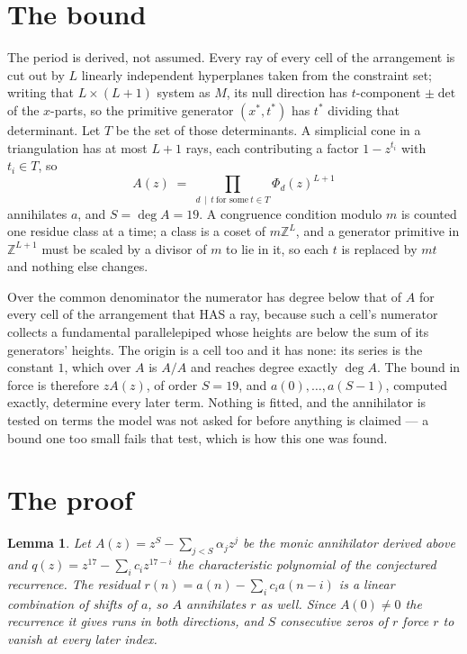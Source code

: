 \documentclass[11pt,a4paper]{article}
\theoremstyle{plain}
\newtheorem{lemma}[theorem]{Lemma}
\theoremstyle{definition}
\begin{document}
\section{The bound}

The period is derived, not assumed. Every ray of every cell of the arrangement is cut out by
$L$ linearly independent hyperplanes taken from the constraint set; writing that $L\times(L+1)$
system as $M$, its null direction has $t$-component $\pm\det$ of the $x$-parts, so the
primitive generator $(x^*,t^*)$ has $t^*$ dividing that determinant. Let $T$ be the set of
those determinants. A simplicial cone in a triangulation has at most $L+1$ rays, each
contributing a factor $1-z^{t_i}$ with $t_i\in T$, so
\[
A(z)\;=\;\prod_{d\,\mid\,t\ \text{for some}\ t\in T}\Phi_d(z)^{L+1}
\]
annihilates $a$, and $S=\deg A=19$. A congruence condition modulo $m$ is counted one residue
class at a time; a class is a coset of $m\mathbb{Z}^L$, and a generator primitive in
$\mathbb{Z}^{L+1}$ must be scaled by a divisor of $m$ to lie in it, so each $t$ is replaced
by $mt$ and nothing else changes.

Over the common denominator the numerator has degree below that of $A$ for every cell of the
arrangement that HAS a ray, because such a cell's numerator collects a fundamental
parallelepiped whose heights are below the sum of its generators' heights. The origin is a cell
too and it has none: its series is the constant $1$, which over $A$ is $A/A$ and reaches degree
exactly $\deg A$. The bound in force is therefore $zA(z)$, of order $S=19$, and
$a(0),\dots,a(S-1)$, computed exactly, determine every later term. Nothing is fitted, and the
annihilator is tested on terms the model was not asked for before anything is claimed --- a
bound one too small fails that test, which is how this one was found.

\section{The proof}

\begin{lemma}\label{lem:crit}
Let $A(z)=z^S-\sum_{j<S}\alpha_jz^{j}$ be the monic annihilator derived above and
$q(z)=z^{17}-\sum_ic_iz^{17-i}$ the characteristic polynomial of the conjectured
recurrence. The residual $r(n)=a(n)-\sum_ic_ia(n-i)$ is a linear combination of shifts of $a$,
so $A$ annihilates $r$ as well. Since $A(0)\ne0$ the recurrence it gives runs in both
directions, and $S$ consecutive zeros of $r$ force $r$ to vanish at every later index.
\end{lemma}
\end{document}
